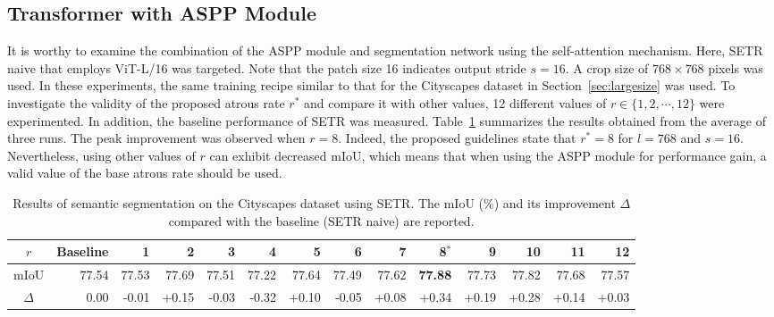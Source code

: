 \documentclass{article}
\def\secref#1{Section~\ref{#1}}
\def\tabref#1{Table~\ref{#1}}
\begin{document}
\subsection{Transformer with ASPP Module} It is worthy to examine the combination of the ASPP module and segmentation network using the self-attention mechanism. Here, SETR naive that employs ViT-L/16 was targeted. Note that the patch size 16 indicates output stride $s=16$. A crop size of $768 \times 768$ pixels was used. In these experiments, the same training recipe similar to that for the Cityscapes dataset in \secref{sec:largesize} was used. To investigate the validity of the proposed atrous rate $r^*$ and compare it with other values, 12 different values of $r \in \{1, 2, \cdots, 12\}$ were experimented. In addition, the baseline performance of SETR was measured. \tabref{tab:setr} summarizes the results obtained from the average of three runs. The peak improvement was observed when $r=8$. Indeed, the proposed guidelines state that $r^*=8$ for $l=768$ and $s=16$. Nevertheless, using other values of $r$ can exhibit decreased mIoU, which means that when using the ASPP module for performance gain, a valid value of the base atrous rate should be used.

\begin{table}[t!]
	\caption{Results of semantic segmentation on the Cityscapes dataset using SETR. The mIoU (\%) and its improvement $\Delta$ compared with the baseline (SETR naive) are reported.}
	\label{tab:setr}
	\centering
    \begin{adjustbox}{width=\textwidth,center}
	\begin{tabular}{c|rrrrrrrrrrrrr}
		\toprule
		$r$      & Baseline & 1     & 2     & 3     & 4     & 5     & 6     & 7     & 8$^*$          & 9     & 10    & 11    & 12    \\
		\midrule
		mIoU     & 77.54    & 77.53 & 77.69 & 77.51 & 77.22 & 77.64 & 77.49 & 77.62 & \textbf{77.88} & 77.73 & 77.82 & 77.68 & 77.57 \\
		$\Delta$ & 0.00     & -0.01 & +0.15 & -0.03 & -0.32 & +0.10 & -0.05 & +0.08 & +0.34          & +0.19 & +0.28 & +0.14 & +0.03 \\
		\bottomrule
	\end{tabular}
    \end{adjustbox}
\end{table}
\end{document}
